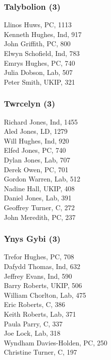 \documentclass[a4paper,openany,10pt]{book}
\begin{document}
\subsubsection*{Talybolion (3)}



Llinos Huws, PC, 1113\\
Kenneth Hughes, Ind, 917\\
John Griffith, PC, 800\\
Elwyn Schofield, Ind, 783\\
Emrys Hughes, PC, 740\\
Julia Dobson, Lab, 507\\
Peter Smith, UKIP, 321\\


\vfill

\subsubsection*{Twrcelyn (3)}



Richard Jones, Ind, 1455\\
Aled Jones, LD, 1279\\
Will Hughes, Ind, 920\\
Elfed Jones, PC, 740\\
Dylan Jones, Lab, 707\\
Derek Owen, PC, 701\\
Gordon Warren, Lab, 512\\
Nadine Hall, UKIP, 408\\
Daniel Jones, Lab, 391\\
Geoffrey Turner, C, 272\\
John Meredith, PC, 237\\


\vfill

\subsubsection*{Ynys Gybi (3)}



Trefor Hughes, PC, 708\\
Dafydd Thomas, Ind, 632\\
Jeffrey Evans, Ind, 590\\
Barry Roberts, UKIP, 506\\
William Chorlton, Lab, 475\\
Eric Roberts, C, 386\\
Keith Roberts, Lab, 371\\
Paula Parry, C, 337\\
Joe Lock, Lab, 318\\
{Wyndham Davies-Holden}, PC, 250\\
Christine Turner, C, 197\\
\end{document}
